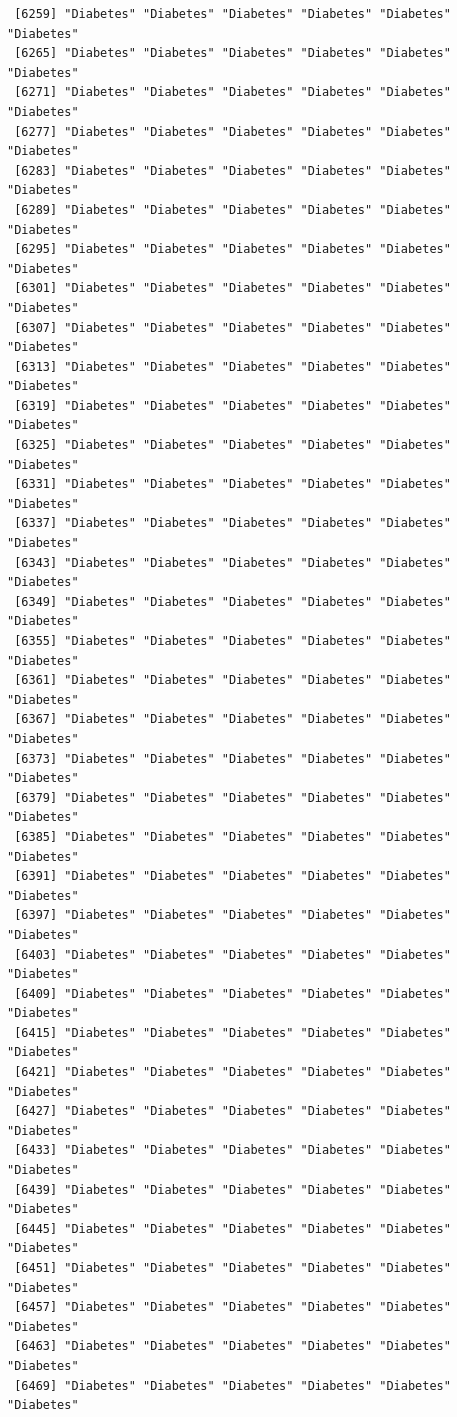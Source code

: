 \documentclass[
  letterpaper,
  DIV=11,
  numbers=noendperiod]{scrartcl}
\begin{document}
\begin{verbatim}
 [6259] "Diabetes" "Diabetes" "Diabetes" "Diabetes" "Diabetes" "Diabetes"
 [6265] "Diabetes" "Diabetes" "Diabetes" "Diabetes" "Diabetes" "Diabetes"
 [6271] "Diabetes" "Diabetes" "Diabetes" "Diabetes" "Diabetes" "Diabetes"
 [6277] "Diabetes" "Diabetes" "Diabetes" "Diabetes" "Diabetes" "Diabetes"
 [6283] "Diabetes" "Diabetes" "Diabetes" "Diabetes" "Diabetes" "Diabetes"
 [6289] "Diabetes" "Diabetes" "Diabetes" "Diabetes" "Diabetes" "Diabetes"
 [6295] "Diabetes" "Diabetes" "Diabetes" "Diabetes" "Diabetes" "Diabetes"
 [6301] "Diabetes" "Diabetes" "Diabetes" "Diabetes" "Diabetes" "Diabetes"
 [6307] "Diabetes" "Diabetes" "Diabetes" "Diabetes" "Diabetes" "Diabetes"
 [6313] "Diabetes" "Diabetes" "Diabetes" "Diabetes" "Diabetes" "Diabetes"
 [6319] "Diabetes" "Diabetes" "Diabetes" "Diabetes" "Diabetes" "Diabetes"
 [6325] "Diabetes" "Diabetes" "Diabetes" "Diabetes" "Diabetes" "Diabetes"
 [6331] "Diabetes" "Diabetes" "Diabetes" "Diabetes" "Diabetes" "Diabetes"
 [6337] "Diabetes" "Diabetes" "Diabetes" "Diabetes" "Diabetes" "Diabetes"
 [6343] "Diabetes" "Diabetes" "Diabetes" "Diabetes" "Diabetes" "Diabetes"
 [6349] "Diabetes" "Diabetes" "Diabetes" "Diabetes" "Diabetes" "Diabetes"
 [6355] "Diabetes" "Diabetes" "Diabetes" "Diabetes" "Diabetes" "Diabetes"
 [6361] "Diabetes" "Diabetes" "Diabetes" "Diabetes" "Diabetes" "Diabetes"
 [6367] "Diabetes" "Diabetes" "Diabetes" "Diabetes" "Diabetes" "Diabetes"
 [6373] "Diabetes" "Diabetes" "Diabetes" "Diabetes" "Diabetes" "Diabetes"
 [6379] "Diabetes" "Diabetes" "Diabetes" "Diabetes" "Diabetes" "Diabetes"
 [6385] "Diabetes" "Diabetes" "Diabetes" "Diabetes" "Diabetes" "Diabetes"
 [6391] "Diabetes" "Diabetes" "Diabetes" "Diabetes" "Diabetes" "Diabetes"
 [6397] "Diabetes" "Diabetes" "Diabetes" "Diabetes" "Diabetes" "Diabetes"
 [6403] "Diabetes" "Diabetes" "Diabetes" "Diabetes" "Diabetes" "Diabetes"
 [6409] "Diabetes" "Diabetes" "Diabetes" "Diabetes" "Diabetes" "Diabetes"
 [6415] "Diabetes" "Diabetes" "Diabetes" "Diabetes" "Diabetes" "Diabetes"
 [6421] "Diabetes" "Diabetes" "Diabetes" "Diabetes" "Diabetes" "Diabetes"
 [6427] "Diabetes" "Diabetes" "Diabetes" "Diabetes" "Diabetes" "Diabetes"
 [6433] "Diabetes" "Diabetes" "Diabetes" "Diabetes" "Diabetes" "Diabetes"
 [6439] "Diabetes" "Diabetes" "Diabetes" "Diabetes" "Diabetes" "Diabetes"
 [6445] "Diabetes" "Diabetes" "Diabetes" "Diabetes" "Diabetes" "Diabetes"
 [6451] "Diabetes" "Diabetes" "Diabetes" "Diabetes" "Diabetes" "Diabetes"
 [6457] "Diabetes" "Diabetes" "Diabetes" "Diabetes" "Diabetes" "Diabetes"
 [6463] "Diabetes" "Diabetes" "Diabetes" "Diabetes" "Diabetes" "Diabetes"
 [6469] "Diabetes" "Diabetes" "Diabetes" "Diabetes" "Diabetes" "Diabetes"

\end{verbatim}
\end{document}
